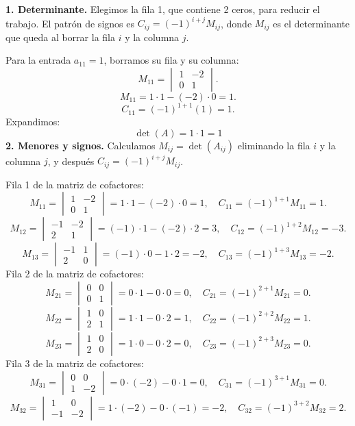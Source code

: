 \documentclass[12pt]{article}
\theoremstyle{remark}
\begin{document}
\textbf{1. Determinante.}
Elegimos la fila 1, que contiene 2 ceros, para reducir el trabajo. El patrón de signos es $C_{ij}=(-1)^{i+j}M_{ij}$, donde $M_{ij}$ es el determinante que queda al borrar la fila $i$ y la columna $j$.

Para la entrada $a_{11}=1$, borramos su fila y su columna:
\[
M_{11}=\begin{vmatrix}1&-2\\0&1\end{vmatrix}.
\]
\[
M_{11}=1\cdot 1-(-2)\cdot 0=1.
\]
\[
C_{11}=(-1)^{1+1}(1)=1.
\]
Expandimos: \[
\boxed{\det(A)=1\cdot 1=1}
\]
\textbf{2. Menores y signos.} Calculamos $M_{ij}=\det(A_{ij})$ eliminando la fila $i$ y la columna $j$, y después $C_{ij}=(-1)^{i+j}M_{ij}$.

Fila 1 de la matriz de cofactores:
\[
M_{11}=\begin{vmatrix}1&-2\\0&1\end{vmatrix}=1\cdot 1-(-2)\cdot 0=1,\quad C_{11}=(-1)^{1+1}M_{11}=1.
\]
\[
M_{12}=\begin{vmatrix}-1&-2\\2&1\end{vmatrix}=(-1)\cdot 1-(-2)\cdot 2=3,\quad C_{12}=(-1)^{1+2}M_{12}=-3.
\]
\[
M_{13}=\begin{vmatrix}-1&1\\2&0\end{vmatrix}=(-1)\cdot 0-1\cdot 2=-2,\quad C_{13}=(-1)^{1+3}M_{13}=-2.
\]
Fila 2 de la matriz de cofactores:
\[
M_{21}=\begin{vmatrix}0&0\\0&1\end{vmatrix}=0\cdot 1-0\cdot 0=0,\quad C_{21}=(-1)^{2+1}M_{21}=0.
\]
\[
M_{22}=\begin{vmatrix}1&0\\2&1\end{vmatrix}=1\cdot 1-0\cdot 2=1,\quad C_{22}=(-1)^{2+2}M_{22}=1.
\]
\[
M_{23}=\begin{vmatrix}1&0\\2&0\end{vmatrix}=1\cdot 0-0\cdot 2=0,\quad C_{23}=(-1)^{2+3}M_{23}=0.
\]
Fila 3 de la matriz de cofactores:
\[
M_{31}=\begin{vmatrix}0&0\\1&-2\end{vmatrix}=0\cdot (-2)-0\cdot 1=0,\quad C_{31}=(-1)^{3+1}M_{31}=0.
\]
\[
M_{32}=\begin{vmatrix}1&0\\-1&-2\end{vmatrix}=1\cdot (-2)-0\cdot (-1)=-2,\quad C_{32}=(-1)^{3+2}M_{32}=2.
\]
\end{document}
